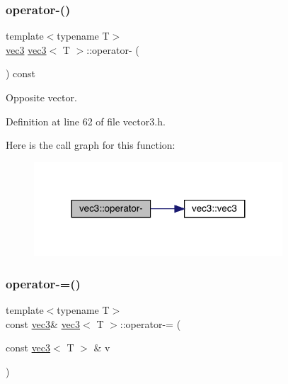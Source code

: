 \subsubsection{\texorpdfstring{operator-\/()}{operator-()}\hspace{0.1cm}{\footnotesize\ttfamily [3/3]}}
{\footnotesize\ttfamily template$<$typename T$>$ \\
\mbox{\hyperlink{structvec3}{vec3}} \mbox{\hyperlink{structvec3}{vec3}}$<$ T $>$\+::operator-\/ (\begin{DoxyParamCaption}{ }\end{DoxyParamCaption}) const\hspace{0.3cm}{\ttfamily [inline]}}



Opposite vector. 



Definition at line 62 of file vector3.\+h.

Here is the call graph for this function\+:\nopagebreak
\begin{figure}[H]
\begin{center}
\leavevmode
\includegraphics[width=263pt]{structvec3_a9ee0d5d83bd70141b9424928d0ea9c98_cgraph}
\end{center}
\end{figure}
\mbox{\label{structvec3_a6302bef90ffb5d572b9d452d902266c5}} 
\subsubsection{\texorpdfstring{operator-\/=()}{operator-=()}\hspace{0.1cm}{\footnotesize\ttfamily [1/2]}}
{\footnotesize\ttfamily template$<$typename T$>$ \\
const \mbox{\hyperlink{structvec3}{vec3}}\& \mbox{\hyperlink{structvec3}{vec3}}$<$ T $>$\+::operator-\/= (\begin{DoxyParamCaption}\item[{const \mbox{\hyperlink{structvec3}{vec3}}$<$ T $>$ \&}]{v }\end{DoxyParamCaption})\hspace{0.3cm}{\ttfamily [inline]}}



